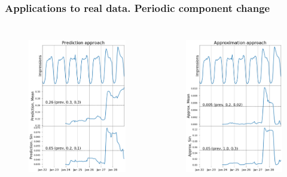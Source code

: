 \documentclass[intlimits, 9pt, unicode]{beamer}
\begin{document}
\begin{frame}
    \frametitle{Applications to real data. Periodic component change}
  \begin{columns}[T,onlytextwidth]
	\begin{figure}
	\includegraphics[height=6.5cm]{images/methods_comparison_3_1}
	\end{figure}
	
	\begin{figure}
	\includegraphics[height=6.5cm]{images/methods_comparison_3_2}
	\end{figure}
	
     \end{columns}

\end{frame}
\end{document}
